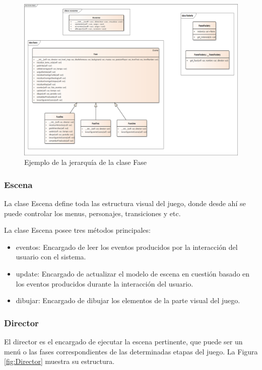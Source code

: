 \begin{figure}[H]
	\centering
	\includegraphics[scale=0.30]{imagenes/Fases.png}
	\caption{\label{fig:Fases}Ejemplo de la jerarquía de la clase Fase}
\end{figure}

\subsubsection{Escena}
La clase Escena define toda las estructura visual del juego, donde desde ahí se puede controlar los menus, personajes, transiciones y etc.

La clase Escena posee tres métodos principales:
\begin{itemize}
	\item eventos: Encargado de leer los eventos producidos por la interacción del usuario con el sistema.
	\item update: Encargado de actualizar el modelo de escena en cuestión basado en los eventos producidos durante la interacción del usuario.
	\item dibujar: Encargado de dibujar los elementos de la parte visual del juego.
\end{itemize}

\subsubsection{Director}
El director es el encargado de ejecutar la escena pertinente, que puede ser un menú o las fases correspondientes de las determinadas etapas del juego. La Figura \ref{fig:Director} muestra su estructura.

